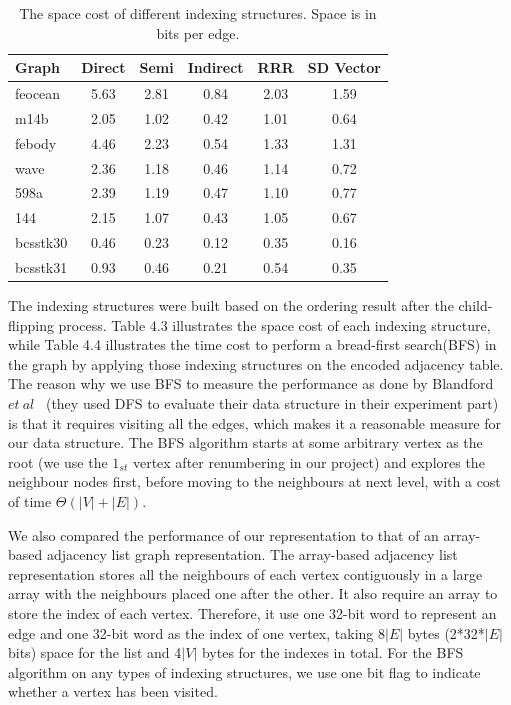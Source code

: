 \documentclass[12pt,glossary]{dalthesis}
\begin{document}
\begin{table}[ht]
\centering
\caption{The space cost of different indexing structures. Space is in bits per edge.}
\label{my-label}
\begin{tabular}{|l||c||c||c||c||c|}
\hline
Graph    & Direct & Semi & Indirect & RRR & SD Vector \\ \hline
feocean  &    5.63    &   2.81   &     0.84     &  2.03   &   1.59        \\
m14b     &    2.05    &   1.02   &    0.42      &  1.01   &   0.64        \\
febody   &    4.46   &   2.23   &     0.54     &  1.33   &    1.31        \\
wave     &   2.36    &   1.18   &    0.46      &   1.14   &   0.72         \\
598a     &    2.39    &   1.19   &   0.47       &  1.10   &    0.77       \\
144      &    2.15   &   1.07   &    0.43      &  1.05    &   0.67          \\
bcsstk30 &   0.46   &   0.23   &      0.12    &   0.35   &   0.16        \\
bcsstk31 &   0.93   &   0.46   &     0.21     &  0.54   &   0.35        \\ \hline
\end{tabular}
\end{table}
\bigskip

The indexing structures were built based on the ordering result after the child-flipping process. Table 4.3 illustrates the space cost of each indexing structure, while Table 4.4 illustrates the time cost to perform a bread-first search(BFS) in the graph by applying those indexing structures on the encoded adjacency table. The reason why we use BFS to measure the performance as done by Blandford $et \ al$~\cite{compact-representation} (they used DFS to evaluate their data structure in their experiment part) is that it requires visiting all the edges, which makes it a reasonable measure for our data structure. The BFS algorithm starts at some arbitrary vertex as the root (we use the $1_{st}$ vertex after renumbering in our project) and explores the neighbour nodes first, before moving to the neighbours at next level, with a cost of time $\Theta(|V| + |E|)$. 

\bigskip

We also compared the performance of our representation to that of an array-based adjacency list graph representation. The array-based adjacency list representation stores all the neighbours of each vertex contiguously in a large array with the neighbours placed one after the other. It also require an array to store the index of each vertex. Therefore, it use one 32-bit word to represent an edge and one 32-bit word as the index of one vertex, taking 8$|E|$ bytes (2*32*$|E|$ bits) space for the list and 4$|V|$ bytes for the indexes in total. For the BFS algorithm on any types of indexing structures, we use one bit flag to indicate whether a vertex has been visited.
\bigskip     
\end{document}
